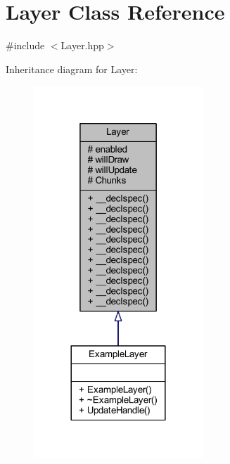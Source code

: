 \hypertarget{class_layer}{\section{Layer Class Reference}
\label{class_layer}
}


{\ttfamily \#include $<$Layer.\-hpp$>$}



Inheritance diagram for Layer\-:\nopagebreak
\begin{figure}[H]
\begin{center}
\leavevmode
\includegraphics[width=180pt]{class_layer__inherit__graph}
\end{center}
\end{figure}


